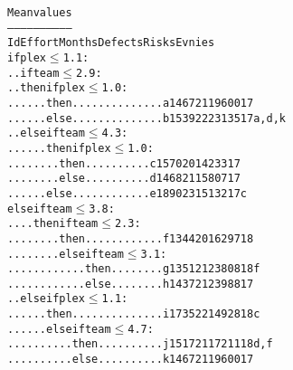 {\scriptsize
\begin{alltt}
                                                   Mean values
                                         ------------------------------
                                   Id    Effort  Months  Defects  Risks   Evnies
 if plex \(\le\) 1.1:
 .. if team \(\le\) 2.9:
 .. then  if plex \(\le\) 1.0:
 .. .. .. then.. .. .. .. .. .. .. a     1467    21      19600    17
 .. .. .. else.. .. .. .. .. .. .. b     1539    22      23135    17      a,d,k
 .. else  if team \(\le\) 4.3:
 .. .. .. then if plex \(\le\) 1.0:
 .. .. .. ..   then.. .. .. .. ..  c     1570    20      14233    17
 .. .. .. ..   else.. .. .. .. ..  d     1468    21      15807    17
 .. .. .. else ..  .. .. .. .. ..  e     1890    23      15132    17      c
 else  if team \(\le\) 3.8:
 .. .. then  if  team \(\le\) 2.3:
 .. .. .. .. then.. .. .. .. .. .. f     1344    20      16297    18
 .. .. .. .. else  if team \(\le\) 3.1:
 .. .. .. .. .. .. then.. .. .. .. g     1351    21      23808    18      f
 .. .. .. .. .. .. else.. .. .. .. h     1437    21      23988    17
 .. else  if plex \(\le\) 1.1:
 .. .. .. then.. .. .. .. .. .. .. i     1735    22      14928    18      c
 .. .. .. else  if team \(\le\) 4.7:
 .. .. .. .. .. then.. .. .. .. .. j     1517    21      17211    18      d,f
 .. .. .. .. .. else.. .. .. .. .. k     1467    21      19600    17      
\end{alltt}}
